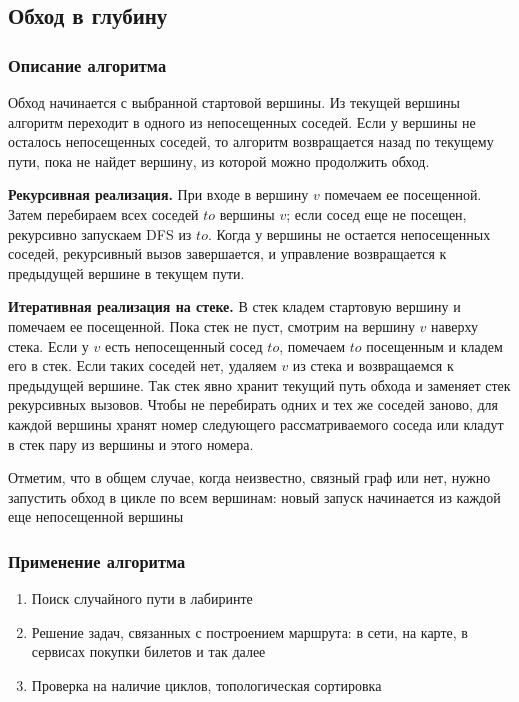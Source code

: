 \documentclass[a4paper]{article}
\begin{document}
\subsection{Обход в глубину}
\subsubsection*{Описание алгоритма}
Обход начинается с выбранной стартовой вершины. Из текущей вершины алгоритм переходит в одного из непосещенных соседей. Если у вершины не осталось непосещенных соседей, то алгоритм возвращается назад по текущему пути, пока не найдет вершину, из которой можно продолжить обход.

\textbf{Рекурсивная реализация.} При входе в вершину $v$ помечаем ее посещенной. Затем перебираем всех соседей $to$ вершины $v$; если сосед еще не посещен, рекурсивно запускаем DFS из $to$. Когда у вершины не остается непосещенных соседей, рекурсивный вызов завершается, и управление возвращается к предыдущей вершине в текущем пути.

\textbf{Итеративная реализация на стеке.} В стек кладем стартовую вершину и помечаем ее посещенной. Пока стек не пуст, смотрим на вершину $v$ наверху стека. Если у $v$ есть непосещенный сосед $to$, помечаем $to$ посещенным и кладем его в стек. Если таких соседей нет, удаляем $v$ из стека и возвращаемся к предыдущей вершине. Так стек явно хранит текущий путь обхода и заменяет стек рекурсивных вызовов. Чтобы не перебирать одних и тех же соседей заново, для каждой вершины хранят номер следующего рассматриваемого соседа или кладут в стек пару из вершины и этого номера.

Отметим, что в общем случае, когда неизвестно, связный граф или нет, нужно запустить обход в цикле по всем вершинам: новый запуск начинается из каждой еще непосещенной вершины

\subsubsection*{Применение алгоритма}
\begin{enumerate}
    \item Поиск случайного пути в лабиринте
    \item Решение задач, связанных с построением маршрута: в сети, на карте, в сервисах покупки билетов и так далее
    \item Проверка на наличие циклов, топологическая сортировка
\end{enumerate}
\end{document}
